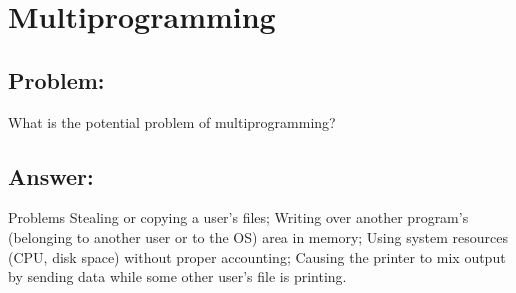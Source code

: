 \newpage
\section{Multiprogramming}
\subsection{Problem:}
What is the potential problem of multiprogramming?

\subsection{Answer:}

Problems Stealing or copying a user's files; Writing over another program's (belonging to another user or to the OS) area in memory; Using system resources (CPU, disk space) without proper accounting; Causing the printer to mix output by sending data while some other user's file is printing.
